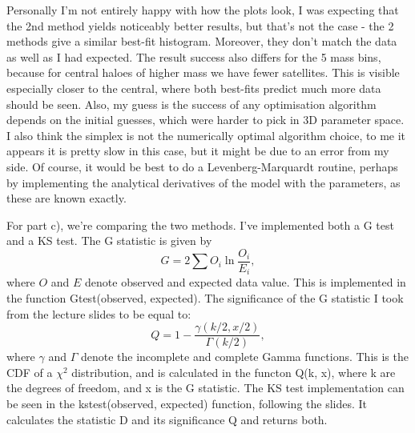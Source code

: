 \documentclass{article}
\begin{document}
Personally I'm not entirely happy with how the plots look, I was expecting that the 2nd method yields noticeably better results, but that's not the case - the 2 methods give a similar best-fit histogram. Moreover, they don't match the data as well as I had expected. The result success also differs for the 5 mass bins, because for central haloes of higher mass we have fewer satellites. This is visible especially closer to the central, where both best-fits predict much more data should be seen. Also, my guess is the success of any optimisation algorithm depends on the initial guesses, which were harder to pick in 3D parameter space. I also think the simplex is not the numerically optimal algorithm choice, to me it appears it is pretty slow in this case, but it might be due to an error from my side. Of course, it would be best to do a Levenberg-Marquardt routine, perhaps by implementing the analytical derivatives of the model with the parameters, as these are known exactly.

For part c), we're comparing the two methods. I've implemented both a G test and a KS test. The G statistic is given by
\begin{equation}
    G = 2 \sum O_i \ln \frac{O_i}{E_i},
\end{equation}
where $O$ and $E$ denote observed and expected data value. This is implemented in the function Gtest(observed, expected). The significance of the G statistic I took from the lecture slides to be equal to:
\begin{equation}
Q = 1 - \frac{\gamma(k/2, x/2)}{\Gamma(k/2)},
\end{equation}
where $\gamma$ and $\Gamma$ denote the incomplete and complete Gamma functions. This is the CDF of a $\chi^2$ distribution, and is calculated in the functon Q(k, x), where k are the degrees of freedom, and x is the G statistic. The KS test implementation can be seen in the ks\textunderscore test(observed, expected) function, following the slides. It calculates the statistic D and its significance Q and returns both.
\end{document}
